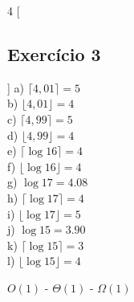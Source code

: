 \documentclass[12pt]{article}
\begin{document}
\begin{multicols}{4}
  [
    \subsection{Exercício 3}
  ]
  a) $\lceil 4,01 \rceil = 5$ \\
  b) $\lfloor 4,01 \rfloor = 4$ \\
  c) $\lceil 4,99 \rceil = 5$ \\
  d) $\lfloor 4,99 \rfloor = 4$ \\
  e) $\lceil \log{16} \rceil = 4$ \\
  f) $\lfloor \log{16} \rfloor = 4$ \\
  g) $\log{17} = 4.08$ \\
  h) $\lceil \log{17} \rceil = 4$ \\
  i) $\lfloor \log{17} \rfloor = 5$ \\
  j) $\log{15} = 3.90$ \\
  k) $\lceil \log{15} \rceil = 3$ \\
  l) $\lfloor \log{15} \rfloor = 4$ \\
\end{multicols}
$O(1)$ - $\Theta(1)$ - $\Omega(1)$\\

  
\end{document}
